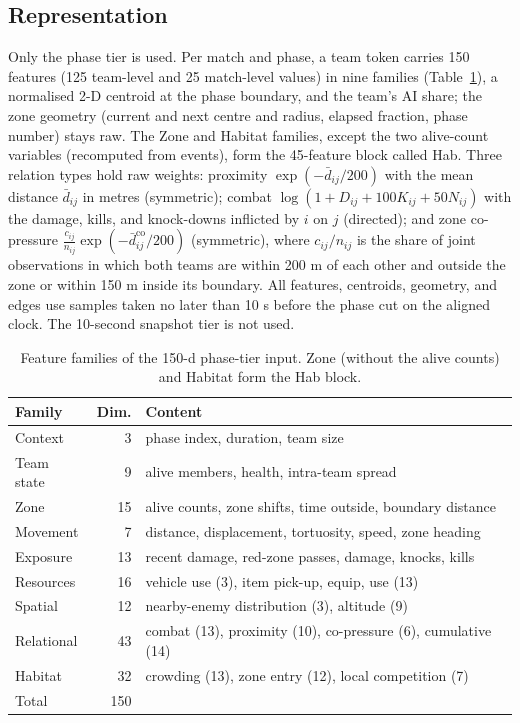 \subsection{Representation}\label{sec:repr}
Only the phase tier is used. Per match and phase, a team token carries 150 features (125 team-level and 25 match-level values) in nine families (Table~\ref{tab:features}), a normalised 2-D centroid at the phase boundary, and the team's AI share; the zone geometry (current and next centre and radius, elapsed fraction, phase number) stays raw. The Zone and Habitat families, except the two alive-count variables (recomputed from events), form the 45-feature block called Hab. Three relation types hold raw weights: proximity $\exp(-\bar d_{ij}/200)$ with the mean distance $\bar d_{ij}$ in metres (symmetric); combat $\log(1+D_{ij}+100K_{ij}+50N_{ij})$ with the damage, kills, and knock-downs inflicted by $i$ on $j$ (directed); and zone co-pressure $\tfrac{c_{ij}}{n_{ij}}\exp(-\bar d^{\mathrm{co}}_{ij}/200)$ (symmetric), where $c_{ij}/n_{ij}$ is the share of joint observations in which both teams are within 200 m of each other and outside the zone or within 150 m inside its boundary. All features, centroids, geometry, and edges use samples taken no later than 10 s before the phase cut on the aligned clock. The 10-second snapshot tier is not used.

\begin{table}[t]
\caption{Feature families of the 150-d phase-tier input. Zone (without the alive counts) and Habitat form the Hab block.}
\label{tab:features}
\centering\footnotesize
\setlength{\tabcolsep}{3pt}
\renewcommand{\arraystretch}{1.05}
\begin{tabular}{@{}l r p{2.2in}@{}}
\toprule
Family & Dim. & Content \\
\midrule
Context & 3 & phase index, duration, team size \\
Team state & 9 & alive members, health, intra-team spread \\
Zone & 15 & alive counts, zone shifts, time outside, boundary distance \\
Movement & 7 & distance, displacement, tortuosity, speed, zone heading \\
Exposure & 13 & recent damage, red-zone passes, damage, knocks, kills \\
Resources & 16 & vehicle use (3), item pick-up, equip, use (13) \\
Spatial & 12 & nearby-enemy distribution (3), altitude (9) \\
Relational & 43 & combat (13), proximity (10), co-pressure (6), cumulative (14) \\
Habitat & 32 & crowding (13), zone entry (12), local competition (7) \\
\midrule
Total & 150 & \\
\bottomrule
\end{tabular}
\end{table}
